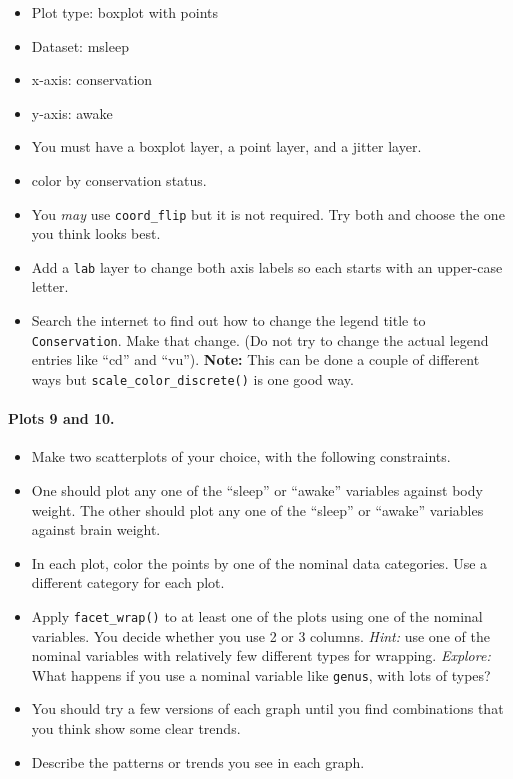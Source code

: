 \documentclass[]{article}
\providecommand{\tightlist}{%
  \setlength{\itemsep}{0pt}\setlength{\parskip}{0pt}}
\let\oldparagraph\paragraph
\renewcommand{\paragraph}[1]{\oldparagraph{#1}\mbox{}}
\begin{document}
\begin{itemize}
\tightlist
\item
  Plot type: boxplot with points
\item
  Dataset: msleep
\item
  x-axis: conservation
\item
  y-axis: awake
\item
  You must have a boxplot layer, a point layer, and a jitter layer.
\item
  color by conservation status.
\item
  You \emph{may} use \texttt{coord\_flip} but it is not required. Try
  both and choose the one you think looks best.
\item
  Add a \texttt{lab} layer to change both axis labels so each starts
  with an upper-case letter.
\item
  Search the internet to find out how to change the legend title to
  \texttt{Conservation}. Make that change. (Do not try to change the
  actual legend entries like ``cd'' and ``vu''). \textbf{Note:} This can
  be done a couple of different ways but
  \texttt{scale\_color\_discrete()} is one good way.
\end{itemize}

\hypertarget{plots-9-and-10.}{%
\paragraph{Plots 9 and 10.}\label{plots-9-and-10.}}

\begin{itemize}
\item
  Make two scatterplots of your choice, with the following constraints.
\item
  One should plot any one of the ``sleep'' or ``awake'' variables
  against body weight. The other should plot any one of the ``sleep'' or
  ``awake'' variables against brain weight.
\item
  In each plot, color the points by one of the nominal data categories.
  Use a different category for each plot.
\item
  Apply \texttt{facet\_wrap()} to at least one of the plots using one of
  the nominal variables. You decide whether you use 2 or 3 columns.
  \emph{Hint:} use one of the nominal variables with relatively few
  different types for wrapping. \emph{Explore:} What happens if you use
  a nominal variable like \texttt{genus}, with lots of types?
\item
  You should try a few versions of each graph until you find
  combinations that you think show some clear trends.
\item
  Describe the patterns or trends you see in each graph.
\end{itemize}
\end{document}
